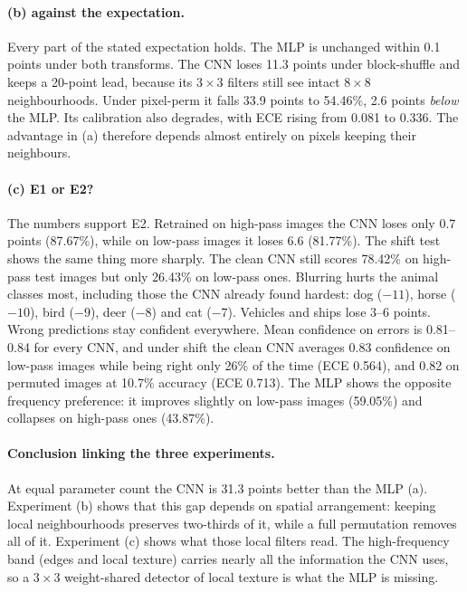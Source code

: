 \documentclass[10pt,twocolumn,a4paper]{article}
\begin{document}
\paragraph{(b) against the expectation.} Every part of the stated expectation holds. The MLP
is unchanged within 0.1 points under both transforms. The CNN loses 11.3 points under
block-shuffle and keeps a 20-point lead, because its $3\times3$ filters still see intact
$8\times8$ neighbourhoods. Under pixel-perm it falls 33.9 points to 54.46\%, 2.6 points
\emph{below} the MLP. Its calibration also degrades, with ECE rising from 0.081 to 0.336. The
advantage in (a) therefore depends almost entirely on pixels keeping their neighbours.

\paragraph{(c) E1 or E2?} The numbers support E2. Retrained on high-pass images the CNN loses only
0.7 points (87.67\%), while on low-pass images it loses 6.6 (81.77\%). The shift test shows the
same thing more sharply. The clean CNN still scores 78.42\% on high-pass test images but only
26.43\% on low-pass ones. Blurring hurts the animal classes most, including those the CNN already
found hardest: dog ($-11$), horse ($-10$), bird ($-9$), deer ($-8$) and cat ($-7$). Vehicles and
ships lose 3--6 points. Wrong predictions stay confident everywhere. Mean confidence on errors is
0.81--0.84 for every CNN, and under shift the clean CNN averages 0.83 confidence on low-pass images
while being right only 26\% of the time (ECE 0.564), and 0.82 on permuted images at 10.7\% accuracy
(ECE 0.713). The MLP shows the opposite frequency preference: it improves slightly on low-pass
images (59.05\%) and collapses on high-pass ones (43.87\%).

\paragraph{Conclusion linking the three experiments.} At equal parameter count the CNN is 31.3
points better than the MLP (a). Experiment (b) shows that this gap depends on spatial arrangement:
keeping local neighbourhoods preserves two-thirds of it, while a full permutation removes all of
it. Experiment (c) shows what those local filters read. The high-frequency band (edges and local
texture) carries nearly all the information the CNN uses, so a $3\times3$ weight-shared detector of
local texture is what the MLP is missing.
\end{document}
